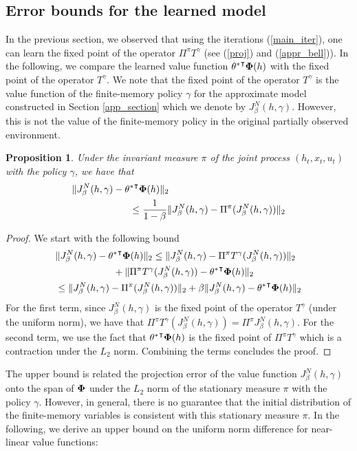\documentclass[letterpaper, 10 pt, conference]{ieeeconf}  %
\newtheorem{prop}{Proposition}
\theoremstyle{definition}
\theoremstyle{remark}
\begin{document}
\subsection{Error bounds for the learned model}
In the previous section, we observed that  using the iterations (\ref{main_iter}), one can learn the fixed point of the operator $\Pi^\pi T^\gamma$ (see (\ref{proj}) and (\ref{appr_bell})). In the following, we compare the learned value function ${\theta^*}^\intercal {\bf \Phi}(h)$ with the fixed point of the operator $T^\gamma$. We note that the fixed point of the operator $T^\gamma$ is the value function of the finite-memory policy $\gamma$ for the approximate model constructed in Section \ref{app_section} which we denote by $J_\beta^N(h,\gamma)$. However, this is not the value of the finite-memory policy in the original partially observed environment.
\begin{prop}\label{l2_bound}
Under the invariant measure $\pi$ of the joint process $(h_t,x_t,u_t)$ with the policy $\gamma$, we have that 
\begin{align*}
&\|J_\beta^N(h,\gamma) - {\theta^*}^\intercal {\bf \Phi}(h)\|_2\\
&\qquad\qquad\qquad \leq\frac{1}{1-\beta}   \|J_\beta^N(h,\gamma) - \Pi^\pi (J_\beta^N(h,\gamma) ) \|_2
\end{align*}
\end{prop}
\begin{proof}
We start with the following bound
\begin{align*}
&\|J_\beta^N(h,\gamma) - {\theta^*}^\intercal {\bf \Phi}(h)\|_2\leq \|J_\beta^N(h,\gamma) - \Pi^\pi T^\gamma(J_\beta^N(h,\gamma) ) \|_2\\
&\qquad\qquad \qquad +  \|\Pi^\pi T^\gamma(J_\beta^N(h,\gamma) )-  {\theta^*}^\intercal {\bf \Phi}(h)\|_2\\
&\leq  \|J_\beta^N(h,\gamma) - \Pi^\pi (J_\beta^N(h,\gamma) ) \|_2 + \beta \|J_\beta^N(h,\gamma) - {\theta^*}^\intercal {\bf \Phi}(h)\|_2
\end{align*}
For the first term, since $J_\beta^N(h,\gamma)$ is the fixed point of the operator $T^\gamma$ (under the uniform norm), we have that $ \Pi^\pi T^\gamma(J_\beta^N(h,\gamma) ) = \Pi^\pi J_\beta^N(h,\gamma)$. For the second term, we use the fact that ${\theta^*}^\intercal {\bf \Phi}(h)$ is the fixed point of $\Pi^\pi T^\gamma$ which is a contraction under the $L_2$ norm. Combining the terms concludes the proof.
\end{proof}
The upper bound is related the projection error of the value function $J_\beta^N(h,\gamma)$ onto the span of ${\bf \Phi}$ under the $L_2$ norm of  the stationary measure $\pi$ with the policy $\gamma$. However, in general, there is no guarantee that the initial distribution of the finite-memory variables is consistent with this stationary measure $\pi$. In the following, we derive an  upper bound on the uniform norm difference for near-linear value functions:
\end{document}
